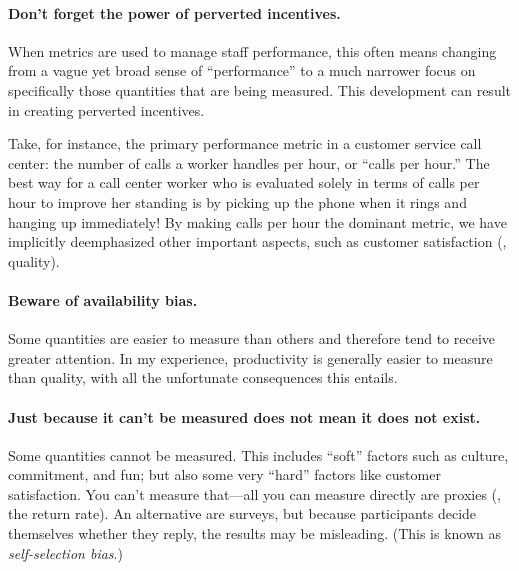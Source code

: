 \paragraph{Don't forget the power of perverted incentives.}
  When metrics are used to manage
staff performance, this often means changing from a vague yet broad sense of
``performance'' to a much narrower focus on specifically those quantities that are being
measured. This development can result in creating perverted
incentives.\vfill\pagebreak

Take, for instance, the primary performance metric in a customer
service call center: the number of calls a worker handles per hour, or
``calls per hour.''  The best way for a call center worker who is
evaluated solely in terms of calls per hour to improve her standing is by
picking up the phone when it rings and hanging up immediately! By
making calls per hour the dominant metric, we have implicitly
deemphasized other important aspects, such as customer satisfaction
(\ie, quality).

\paragraph{Beware of availability bias.}
Some quantities are easier to measure than others and therefore tend
to receive greater attention. In my experience, productivity is
generally easier to measure than quality, with all the unfortunate
consequences this entails.


\paragraph{Just because it can't be measured does not mean it does not
exist.}   Some quantities cannot be measured. This includes ``soft'' factors
such as culture, commitment, and fun; but also some very ``hard'' factors
like customer satisfaction. You can't measure that---all you can
measure directly are proxies (\eg, the return rate). An alternative are
surveys, but because participants decide themselves whether they
reply, the results may be misleading.  (This is known as
\emph{self-selection bias}.)

% 

